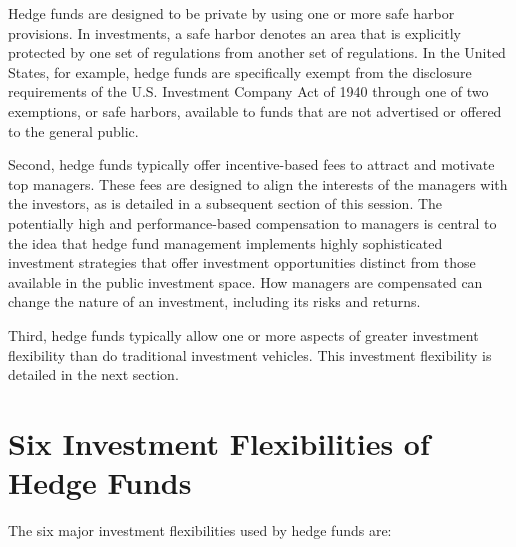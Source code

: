 \documentclass[11pt]{article}
\begin{document}
Hedge funds are designed to be private by using one or more safe harbor provisions. In investments, a safe harbor denotes an area that is explicitly protected by one set of regulations from another set of regulations. In the United States, for example, hedge funds are specifically exempt from the disclosure requirements of the U.S. Investment Company Act of 1940 through one of two exemptions, or safe harbors, available to funds that are not advertised or offered to the general public.

Second, hedge funds typically offer incentive-based fees to attract and motivate top managers. These fees are designed to align the interests of the managers with the investors, as is detailed in a subsequent section of this session. The potentially high and performance-based compensation to managers is central to the idea that hedge fund management implements highly sophisticated investment strategies that offer investment opportunities distinct from those available in the public investment space. How managers are compensated can change the nature of an investment, including its risks and returns.

Third, hedge funds typically allow one or more aspects of greater investment flexibility than do traditional investment vehicles. This investment flexibility is detailed in the next section.

\section*{Six Investment Flexibilities of Hedge Funds}
The six major investment flexibilities used by hedge funds are:
\end{document}
